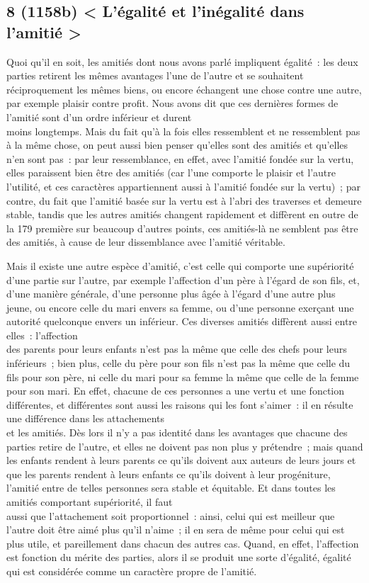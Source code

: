 \documentclass[french,twoside]{book} %
\begin{document}
\subsection[{8 (1158b) < L’égalité et l’inégalité dans l’amitié >}]{8 (1158b) < L’égalité et l’inégalité dans l’amitié >}
\noindent  Quoi qu’il en soit, les amitiés dont nous avons parlé impliquent égalité : les deux parties retirent les mêmes avantages l’une de l’autre et se souhaitent réciproquement les mêmes biens, ou encore échangent une chose contre une autre, par exemple plaisir contre profit. Nous avons dit que ces dernières formes de l’amitié sont d’un ordre inférieur et durent \\
moins longtemps. Mais du fait qu’à la fois elles ressemblent et ne ressemblent pas à la même chose, on peut aussi bien penser qu’elles sont des amitiés et qu’elles n’en sont pas : par leur ressemblance, en effet, avec l’amitié fondée sur la vertu, elles paraissent bien être des amitiés (car l’une comporte le plaisir et l’autre l’utilité, et ces caractères appartiennent aussi à l’amitié fondée sur la vertu) ; par contre, du fait que l’amitié basée sur la vertu est à l’abri des traverses et demeure stable, tandis que les autres amitiés changent rapidement et diffèrent en outre de \\
la 179 première sur beaucoup d’autres points, ces amitiés-là ne semblent pas être des amitiés, à cause de leur dissemblance avec l’amitié véritable.\par
Mais il existe une autre espèce d’amitié, c’est celle qui comporte une supériorité d’une partie sur l’autre, par exemple l’affection d’un père à l’égard de son fils, et, d’une manière générale, d’une personne plus âgée à l’égard d’une autre plus jeune, ou encore celle du mari envers sa femme, ou d’une personne exerçant une autorité quelconque envers un inférieur. Ces diverses amitiés diffèrent aussi entre elles : l’affection \\
des parents pour leurs enfants n’est pas la même que celle des chefs pour leurs inférieurs ; bien plus, celle du père pour son fils n’est pas la même que celle du fils pour son père, ni celle du mari pour sa femme la même que celle de la femme pour son mari. En effet, chacune de ces personnes a une vertu et une fonction différentes, et différentes sont aussi les raisons qui les font s’aimer : il en résulte une différence dans les attachements \\
et les amitiés. Dès lors il n’y a pas identité dans les avantages que chacune des parties retire de l’autre, et elles ne doivent pas non plus y prétendre ; mais quand les enfants rendent à leurs parents ce qu’ils doivent aux auteurs de leurs jours et que les parents rendent à leurs enfants ce qu’ils doivent à leur progéniture, l’amitié entre de telles personnes sera stable et équitable. Et dans toutes les amitiés comportant supériorité, il faut \\
aussi que l’attachement soit proportionnel : ainsi, celui qui est meilleur que l’autre doit être aimé plus qu’il n’aime ; il en sera de même pour celui qui est plus utile, et pareillement dans chacun des autres cas. Quand, en effet, l’affection est fonction du mérite des parties, alors il se produit une sorte d’égalité, égalité qui est considérée comme un caractère propre de l’amitié.
\end{document}
